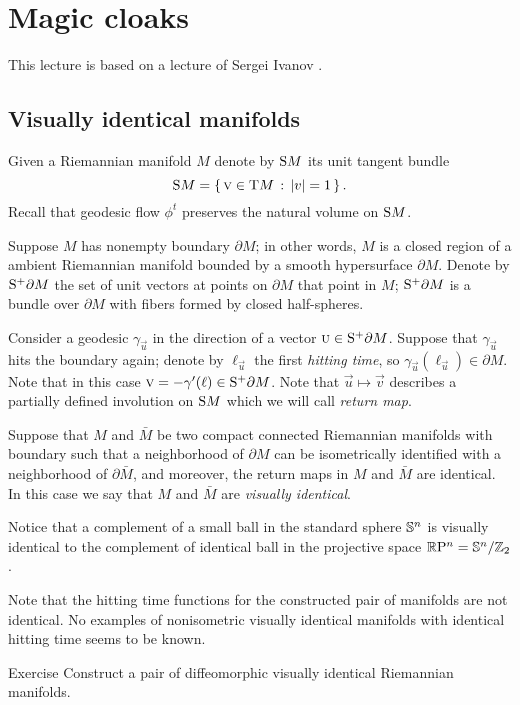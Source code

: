 \chapter{Magic cloaks}

This lecture is based on a lecture of Sergei Ivanov \cite{ivanov-2012}.

\section{Visually identical manifolds}

Given a Riemannian manifold $M$ denote by $\S M$ its unit tangent bundle
\[\S M=\set{\vec v\in \T M}{|v|=1}.\]
Recall that geodesic flow $\phi^t$ preserves the natural volume on $\S M$.

Suppose $M$ has nonempty boundary $\partial M$;
in other words, $M$ is a closed region of a ambient Riemannian  manifold bounded by a smooth hypersurface $\partial M$.
Denote by $\S^+ \partial M$ the set of unit vectors at points on $\partial M$ that point in $M$;
$\S^+ \partial M$ is a bundle over $\partial M$ with fibers formed by closed half-spheres.

Consider a geodesic $\gamma_{\vec u}$ in the direction of a vector $\vec u\in \S^+ \partial M$.
Suppose that $\gamma_{\vec u}$ hits the boundary again; 
denote by $\ell_{\vec u}$ the first \emph{hitting time}, so $\gamma_{\vec u}(\ell_{\vec u})\in \partial M$.
Note that in this case $\vec v=-\gamma'(\ell)\in \S^+ \partial M$.
Note that $\vec u\mapsto \vec v$ describes a partially defined involution on $\S M$ which we will call \emph{return map}.

Suppose that $M$ and $\bar M$ be two compact connected Riemannian manifolds with boundary such that a neighborhood of $\partial M$ can be isometrically identified with a neighborhood of $\partial \bar M$,
and moreover, the return maps in $M$ and $\bar M$ are identical.
In this case we say that $M$ and $\bar M$ are \emph{visually identical}.

Notice that a complement of a small ball in the standard sphere $\SSS^n$ is visually identical to the complement of identical ball in the projective space $\RP^n=\SSS^n/\ZZ_2$.

Note that the hitting time functions for the constructed pair of manifolds are not identical.
No examples of nonisometric visually identical manifolds with identical hitting time seems to be known.

\begin{thm}{Exercise}
Construct a pair of diffeomorphic visually identical Riemannian manifolds.
\end{thm}

